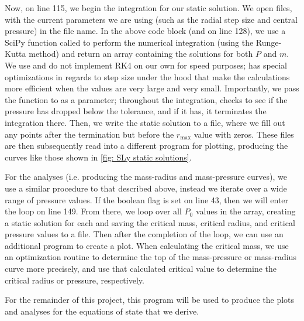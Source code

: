 Now, on line 115, we begin the integration for our static solution. We open files, with the current parameters we are using (such as the radial step size and central pressure) in the file name. In the above code block (and on line 128), we use a SciPy function called  to perform the numerical integration (using the Runge-Kutta method) and return an array containing the solutions for both $P$ and $m$. We use  and do not implement RK4 on our own for speed purposes;  has special optimizations in regards to step size under the hood that make the calculations more efficient when the values are very large and very small. Importantly, we pass the  function to  as a parameter; throughout the integration,  checks to see if the pressure has dropped below the tolerance, and if it has, it terminates the integration there. Then, we write the static solution to a file, where we fill out any points after the termination but before the $r_\text{max}$ value with zeros. These files are then subsequently read into a different program for plotting, producing the curves like those shown in \autoref{fig: SLy static solutions}.

For the analyses (i.e. producing the mass-radius and mass-pressure curves), we use a similar procedure to that described above, instead we iterate over a wide range of pressure values. If the boolean flag  is set on line 43, then we will enter the loop on line 149. From there, we loop over all $P_0$ values in the  array, creating a static solution for each and saving the critical mass, critical radius, and critical pressure values to a file. Then after the completion of the loop, we can use an additional program to create a plot. When calculating the critical mass, we use an optimization routine to determine the top of the mass-pressure or mass-radius curve more precisely, and use that calculated critical value to determine the critical radius or pressure, respectively. 

For the remainder of this project, this program will be used to produce the plots and analyses for the equations of state that we derive.

